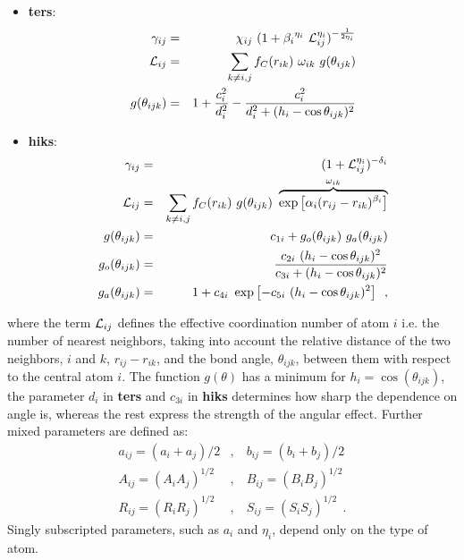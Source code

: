 \begin{itemize}
\item {\bf ters}:
\begin{eqnarray}
\gamma_{ij} &=& \chi_{ij}~(1 + {\beta_{i}}^{\eta_{i}}~{\cal{L}}_{ij}^{\eta_{i}})^{-\frac{1}{2\eta_{i}}} \nonumber \\
{\cal{L}}_{ij} &=& \sum_{k \neq i,j} f_{C}(r_{ik})~\omega_{ik}~g(\theta_{ijk}) \\
g(\theta_{ijk}) &=& 1 + \frac{c_{i}^{2}}{d_{i}^{2}} - \frac{c_{i}^{2}}{d_{i}^{2} + (h_{i} - \cos\theta_{ijk})^{2}} \nonumber
\end{eqnarray}
\item {\bf hiks}:
\begin{eqnarray}
\gamma_{ij} &=& (1 + {\cal{L}}_{ij}^{\eta_{i}})^{-\delta_{i}} \nonumber \\
{\cal{L}}_{ij} &=& \sum_{k \neq i,j} f_{C}(r_{ik})~g(\theta_{ijk})~
\overbrace{\exp \left[\alpha_{i} (r_{ij}-r_{ik})^{\beta_{i}}\right]}^{\omega_{ik}} \nonumber \\
g(\theta_{ijk}) &=& c_{1i} + {g}_{o}(\theta_{ijk})~{g}_{a}(\theta_{ijk}) \\
{g}_{o}(\theta_{ijk}) &=& \frac{c_{2i}~(h_{i} - \cos\theta_{ijk})^{2}}
{c_{3i} + (h_{i} - \cos\theta_{ijk})^{2}} \nonumber \\
{g}_{a}(\theta_{ijk}) &=& 1 + {c_{4i}~\exp \left[-c_{5i}~(h_{i} - \cos\theta_{ijk})^{2}\right]}~~, \nonumber
\end{eqnarray}
\end{itemize}
where the term ${\cal{L}}_{ij}$ defines the effective coordination
number of atom $i$ i.e. the number of nearest neighbors, taking into
account the relative distance of the two neighbors, $i$ and $k$,
$r_{ij}-r_{ik}$, and the bond angle, $\theta_{ijk}$, between them
with respect to the central atom $i$.  The function $g(\theta)$ has
a minimum for $h_{i}=\cos(\theta_{ijk})$, the parameter $d_{i}$ in
{\bf ters} and $c_{3i}$ in {\bf hiks} determines how sharp the dependence
on angle is, whereas the rest express the strength of the angular effect.
Further mixed parameters are defined as:
\begin{eqnarray}
a_{ij} = (a_{i} + a_{j})/2&,&~b_{ij} = (b_{i} + b_{j})/2 \nonumber \\
A_{ij} = (A_{i} A_{j})^{1/2}&,&~B_{ij} = (B_{i} B_{j})^{1/2} \\
R_{ij} = (R_{i} R_{j})^{1/2}&,&~S_{ij} = (S_{i} S_{j})^{1/2}~~.
\nonumber
\end{eqnarray}
Singly subscripted parameters, such as $a_{i}$ and $\eta_{i}$,
depend only on the type of atom.

